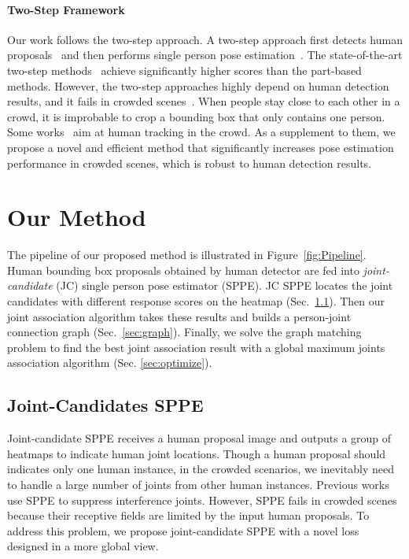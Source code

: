 \documentclass[10pt,twocolumn,letterpaper]{article}
\begin{document}
\paragraph{Two-Step Framework} Our work follows the two-step approach. A two-step approach first detects human proposals~\cite{fasterrcnn, megdet} and then performs single person pose estimation~\cite{hourglass, pyranet}. The state-of-the-art two-step methods~\cite{cpn, msra, alphapose, maskrcnn} achieve significantly higher scores than the part-based methods. However, the two-step approaches highly depend on human detection results, and it fails in crowded scenes~\cite{crowdhuman}. When people stay close to each other in a crowd, it is improbable to crop a bounding box that only contains one person. Some works~\cite{tracking1, tracking2} aim at human tracking in the crowd. As a supplement to them, we propose a novel and efficient method that significantly increases pose estimation performance in crowded scenes, which is robust to human detection results.

\section{Our Method}
The pipeline of our proposed method is illustrated in Figure~\ref{fig:Pipeline}. Human bounding box proposals obtained by human detector are fed into \textit{joint-candidate} (JC) single person pose estimator (SPPE). JC SPPE locates the joint candidates with different response scores on the heatmap (Sec.~\ref{sec:JC_SPPE}). Then our joint association algorithm takes these results and builds a person-joint connection graph (Sec.~\ref{sec:graph}). Finally, we solve the graph matching problem to find the best joint association result with a global maximum joints association algorithm (Sec. \ref{sec:optimize}).

\subsection{Joint-Candidates SPPE} \label{sec:JC_SPPE}
Joint-candidate SPPE receives a human proposal image and outputs a group of heatmaps to indicate human joint locations. Though a human proposal should indicates only one human instance, in the crowded scenarios, we inevitably need to handle a large number of joints from other human instances. Previous works~\cite{msra, cpn, alphapose} use SPPE to suppress interference joints. However, SPPE fails in crowded scenes because their receptive fields are limited by the input human proposals. To address this problem, we propose joint-candidate SPPE with a novel loss designed in a more global view.
\end{document}
